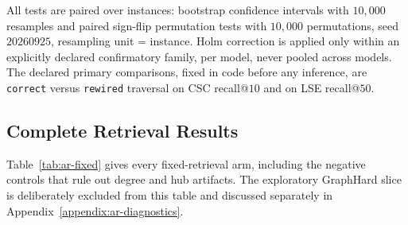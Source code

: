 All tests are paired over instances: bootstrap confidence intervals with $10{,}000$ resamples and
paired sign-flip permutation tests with $10{,}000$ permutations, seed $20260925$, resampling unit =
instance. Holm correction is applied only within an explicitly declared confirmatory family, per
model, never pooled across models. The declared primary comparisons, fixed in code before any
inference, are \texttt{correct} versus \texttt{rewired} traversal on CSC recall@$10$ and on LSE
recall@$50$.

\subsection{Complete Retrieval Results}
\label{appendix:ar-retrieval}

Table~\ref{tab:ar-fixed} gives every fixed-retrieval arm, including the negative controls that
rule out degree and hub artifacts. The exploratory GraphHard slice is deliberately excluded from
this table and discussed separately in Appendix~\ref{appendix:ar-diagnostics}.

